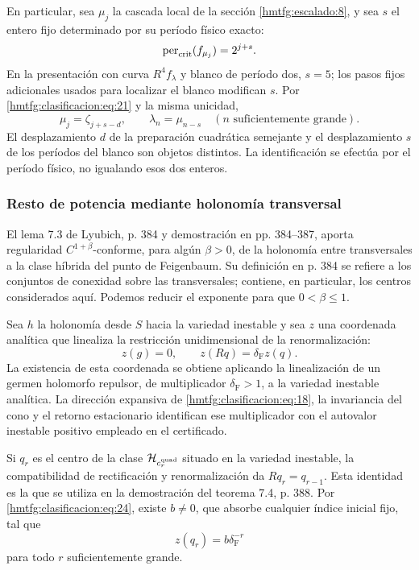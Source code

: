 En particular, sea \(\mu_j\) la cascada local de la sección \ref{hmtfg:escalado:8}, y sea \(s\) el entero fijo determinado por su período físico exacto:
\[
\operatorname{per}_{\rm crit}(f_{\mu_j})=2^{j+s}.
\]
En la presentación con curva \(R^4f_\lambda\) y blanco de período dos, \(s=5\); los pasos fijos adicionales usados para localizar el blanco modifican \(s\). Por \eqref{hmtfg:clasificacion:eq:21} y la misma unicidad,
\begin{equation}
\mu_j=\zeta_{j+s-d},\qquad
\boxed{\lambda_n=\mu_{n-s}\quad(n\text{ suficientemente grande}).}
\label{hmtfg:clasificacion:eq:23}
\end{equation}
El desplazamiento \(d\) de la preparación cuadrática semejante y el desplazamiento \(s\) de los períodos del blanco son objetos distintos. La identificación se efectúa por el período físico, no igualando esos dos enteros.

\subsubsection{Resto de potencia mediante holonomía transversal}
\label{hmtfg:clasificacion:8.4}

El lema 7.3 de Lyubich, p. 384 y demostración en pp. 384–387, aporta regularidad \(C^{1+\beta}\)-conforme, para algún \(\beta>0\), de la holonomía entre transversales a la clase híbrida del punto de Feigenbaum. Su definición en p. 384 se refiere a los conjuntos de conexidad sobre las transversales; contiene, en particular, los centros considerados aquí. Podemos reducir el exponente para que \(0<\beta\le1\).

Sea \(h\) la holonomía desde \(S\) hacia la variedad inestable y sea \(z\) una coordenada analítica que linealiza la restricción unidimensional de la renormalización:
\begin{equation}
z(g)=0,\qquad z(Rq)=\delta_{\mathrm F} z(q).
\label{hmtfg:clasificacion:eq:24}
\end{equation}
La existencia de esta coordenada se obtiene aplicando la linealización de un germen holomorfo repulsor, de multiplicador \(\delta_{\mathrm F}>1\), a la variedad inestable analítica. La dirección expansiva de \eqref{hmtfg:clasificacion:eq:18}, la invariancia del cono y el retorno estacionario identifican ese multiplicador con el autovalor inestable positivo empleado en el certificado.

Si \(q_r\) es el centro de la clase \(\mathcal H_{c_r^{\rm quad}}\) situado en la variedad inestable, la compatibilidad de rectificación y renormalización da \(Rq_r=q_{r-1}\). Esta identidad es la que se utiliza en la demostración del teorema 7.4, p. 388. Por \eqref{hmtfg:clasificacion:eq:24}, existe \(b\ne0\), que absorbe cualquier índice inicial fijo, tal que
\begin{equation}
z(q_r)=b\delta_{\mathrm F}^{-r}
\label{hmtfg:clasificacion:eq:25}
\end{equation}
para todo \(r\) suficientemente grande.

